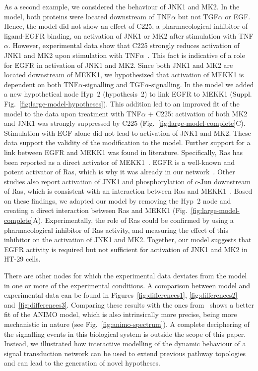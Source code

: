 \documentclass{bmcart}
\begin{document}
As a second example, we considered the behaviour of JNK1 and MK2. In the model, both
proteins were located downstream of TNF$\alpha$ but not TGF$\alpha$ or EGF. Hence, the
model did not show an effect of C225, a pharmacological inhibitor of ligand-EGFR
binding, on activation of JNK1 or MK2 after stimulation with TNF$\alpha$. However, experimental
data show that C225 strongly reduces activation of JNK1 and MK2 upon stimulation with
TNF$\alpha$~\cite{pathway-autocrine}.
This fact is indicative of a role for EGFR in activation of JNK1 and MK2. Since both JNK1 and MK2
are located downstream of MEKK1, we hypothesized that activation
of MEKK1 is dependent on
both TNF$\alpha$-signalling and TGF$\alpha$-signalling. In the model we added a new
hypothetical node {\sf Hyp~2} (hypothesis~2) to link EGFR to MEKK1 (Suppl. Fig.~\ref{fig:large-model-hypotheses}).
This addition led to an improved fit of the model to the data upon treatment with TNF$\alpha$ + C225:
activation of both MK2 and JNK1 was strongly suppressed by C225 (Fig.~\ref{fig:large-model-complete}C).
Stimulation with EGF alone did not lead to activation of JNK1 and MK2.
These data support the validity of the modification to the model.
Further support for a link between EGFR and MEKK1 was found in literature. Specifically,
Ras has been reported as a direct activator of
MEKK1~\cite{ras-mekk1}. EGFR is a well-known and potent activator of Ras,
which is why it was already in our network~\cite{kegg}.
Other studies also report activation of JNK1 and phosphorylation of c-Jun downstream of Ras, which is consistent with
an interaction between Ras and MEKK1~\cite{cfos-cjun,ras-jnk1}.
Based on these findings, we adapted
our model by removing the {\sf Hyp~2} node and creating a direct interaction between Ras
and MEKK1 (Fig.~\ref{fig:large-model-complete}A). Experimentally, the role of Ras could be confirmed by using a
pharmacological inhibitor of Ras activity, and measuring the effect of this inhibitor on the activation of JNK1 and MK2.
Together, our model suggests that EGFR activity is required
but not sufficient for activation of JNK1 and MK2 in HT-29 cells.


There are other nodes for which the experimental data deviates from the model in one or more of the experimental conditions.
A comparison between model and experimental data can be found in Figures~\ref{fig:differences1}, \ref{fig:differences2} and~\ref{fig:differences3}.
Comparing these results with the ones from~\cite{pathway-fuzzy} shows a better fit of the ANIMO model, which is also intrinsically
more precise, being more mechanistic in nature (see Fig.~\ref{fig:animo-spectrum}).
A complete deciphering of the signalling events
in this biological system is outside the scope of this paper. Instead, we illustrated how interactive modelling of the dynamic behaviour
of a signal transduction network can be used to extend previous pathway topologies and can lead to the generation of novel hypotheses.
\end{document}

